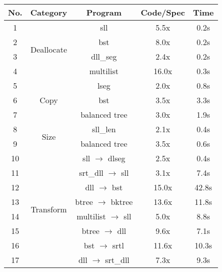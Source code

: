 
    \begin{tabular}{c| c|c|c| c}
    \toprule
    No. & Category & Program & Code/Spec & Time    \\	  
    \midrule
    1 & \multirow{4}{*}{{{Deallocate}}} & sll & 5.5x & 0.2s\\
    2 & & bst & 8.0x & 0.2s\\
    3 & & dll\_seg & 2.4x & 0.2s\\
    4 & & {multilist} & 16.0x & 0.3s\\
    \midrule
    5 &  \multirow{3}{*}{{{Copy}}} & lseg & 2.0x & 0.8s\\
    6 & & bst & 3.5x & 3.3s\\
    7 & & balanced tree & 3.0x & 1.9s\\
    \midrule 
    8 & \multirow{2}{*}{{{Size}}} & sll\_len & 2.1x & 0.4s  \\
    9 & & balanced tree & 3.5x & 0.6s  \\
    \midrule 
    10 & \multirow{8}{*}{{{Transform}}} & sll $\rightarrow$ dlseg & 2.5x & 0.4s  \\
    11 & & {srt\_dll $\rightarrow$ sll} & 3.1x & 7.4s  \\
    12 & & {dll $\rightarrow$ bst} & 15.0x & 42.8s  \\
    13 & & {btree $\rightarrow$ bktree} & 13.6x & 11.8s  \\
    14 & & {multilist $\xrightarrow{}$ sll} & 5.0x & 8.8s  \\
    15 & & {btree $\xrightarrow{}$ dll} & 9.6x & 7.1s  \\
    16 & & {bst $\xrightarrow{}$ srtl} & 11.6x & 10.3s  \\
    17 & & {dll $\xrightarrow{}$ srt\_dll} & 7.3x & 9.3s  \\
      \bottomrule
    \end{tabular}
    
